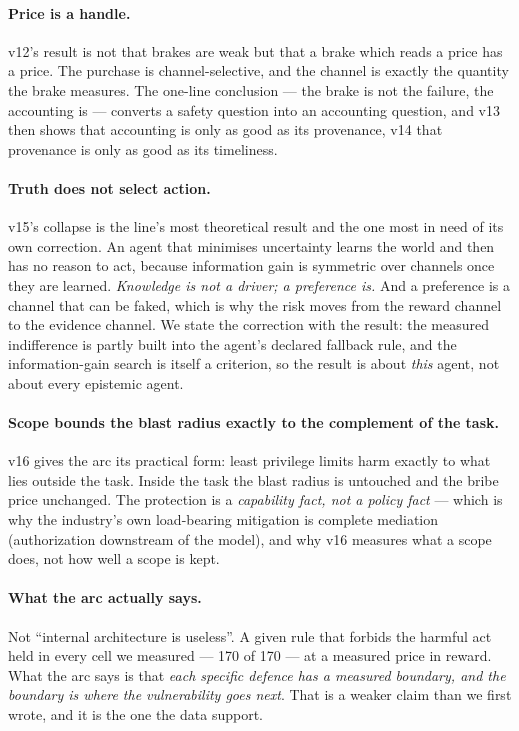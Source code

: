 \documentclass[11pt]{article}
\begin{document}
\paragraph{Price is a handle.} v12's result is not that brakes are weak but that a
brake which reads a price has a price. The purchase is channel-selective, and the
channel is exactly the quantity the brake measures. The one-line conclusion --- the
brake is not the failure, the accounting is --- converts a safety question into an
accounting question, and v13 then shows that accounting is only as good as its
provenance, v14 that provenance is only as good as its timeliness.

\paragraph{Truth does not select action.} v15's collapse is the line's most
theoretical result and the one most in need of its own correction. An agent that
minimises uncertainty learns the world and then has no reason to act, because
information gain is symmetric over channels once they are learned. \emph{Knowledge is
not a driver; a preference is.} And a preference is a channel that can be faked, which
is why the risk moves from the reward channel to the evidence channel. We state the
correction with the result: the measured indifference is partly built into the agent's
declared fallback rule, and the information-gain search is itself a criterion, so the
result is about \emph{this} agent, not about every epistemic agent.

\paragraph{Scope bounds the blast radius exactly to the complement of the task.} v16
gives the arc its practical form: least privilege limits harm exactly to what lies
outside the task. Inside the task the blast radius is untouched and the bribe price
unchanged. The protection is a \emph{capability fact, not a policy fact} --- which is
why the industry's own load-bearing mitigation is complete mediation (authorization
downstream of the model), and why v16 measures what a scope does, not how well a scope
is kept.

\paragraph{What the arc actually says.} Not ``internal architecture is useless''.
A given rule that forbids the harmful act held in every cell we measured --- 170 of
170 --- at a measured price in reward. What the arc says is that \emph{each specific
defence has a measured boundary, and the boundary is where the vulnerability goes
next}. That is a weaker claim than we first wrote, and it is the one the data support.
\end{document}
